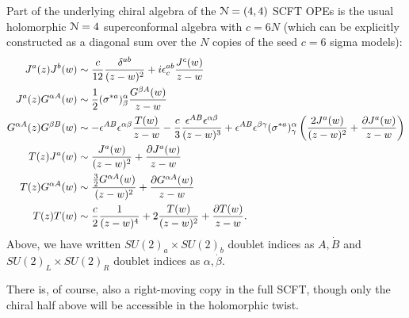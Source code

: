 \documentclass[../main.tex]{subfiles}
\begin{document}
Part of the underlying chiral algebra of the $\mathcal{N}=(4, 4)$ SCFT OPEs is the usual holomorphic $\mathcal N=4$ superconformal algebra with $c=6N$ (which can be explicitly constructed as a diagonal sum over the $N$ copies of the seed $c=6$ sigma models):
\begin{align*}
J^a(z)J^b(w) &\sim  {c \over 12}{\delta^{ab} \over (z-w)^2} + i \epsilon^{ab}_c {J^c(w) \over z-w}\\
J^a(z)G^{\alpha A}(w) &\sim {1 \over 2} (\sigma^{*a})^{\alpha}_{\beta} {G^{\beta A}(w) \over z-w}\\
G^{\alpha A}(z)G^{\beta B}(w) &\sim  - \epsilon^{AB}\epsilon^{\alpha \beta}{T(w) \over z-w} - {c \over 3}{\epsilon^{AB} \epsilon^{\alpha \beta} \over (z-w)^3} + \epsilon^{AB}\epsilon^{\beta\gamma}(\sigma^{*a})^{\alpha}_{\gamma}\left({2 J^a(w) \over (z-w)^2} + {\partial J^a(w) \over z-w} \right)\\
T(z)J^a(w) &\sim {J^a(w) \over (z-w)^2} + {\partial J^a(w) \over z-w}\\
T(z)G^{\alpha A}(w)&\sim { {3 \over 2} G^{\alpha A}(w) \over (z-w)^2} + {\partial G^{\alpha A}(w) \over z-w}\\
T(z)T(w) &\sim {c \over 2}{1 \over (z-w)^4} + 2 {T(w) \over (z-w)^2} + {\partial T(w) \over z-w}.
\end{align*}
Above, we have written $SU(2)_a \times SU(2)_b$ doublet indices as $A, \dot{B}$ and $SU(2)_L\times SU(2)_R$ doublet indices as $\alpha, \dot{\beta}$. 


There is, of course, also a right-moving copy in the full SCFT, though only the chiral half above will be accessible in the holomorphic twist. 

\end{document}
